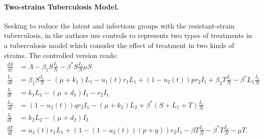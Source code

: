 \paragraph{Two-strains Tuberculosis Model.}
Seeking to reduce the latent and infectious groups with the 
resistant-strain tuberculosis, in \cite{Lenhart2002} the authors  use 
controls ro represents 	two types of treatments in a tuberculosis model 
which consider the effect of treatment in two kinds of strains. The 
controlled version reads:
%
%	
%
%
	\begin{equation}\label{eqn:TB}
	  \begin{aligned}
	    \frac{dS}{dt} &=
		    \Lambda - \beta_1 S \frac{I_1}{N} 
		    - \beta^{*} S \frac{I_2}{N}
		    \mu S
		  \\
		  \frac{L_1}{dt} &=
			  \beta_1 S \frac{I_1}{N}
			  - (\mu + k_1) L_1
			  - u_1 (t) r_1 L_1
			  + (1 - u_2 (t)) p r_2 I_1
				+ \beta_2 T \frac{I_1}{N}
				- \beta^{*} L_1 \frac{I_2}{N}
			\\
			\frac{I_1}{dt} &= 
				k_1 L_1
				- (\mu + d_1) I_1
				-r_2 I_1
			\\
			\frac{L_2}{dt} &=
				(1 - u_2(t)) q r_2 I_1
				- (\mu + k_2) L_2
				+ \beta^{*} (S + L_1 + T) \frac{I_2}{N}
			\\
			\frac{I_2}{dt} &=
				k_2 L_2 - (\mu + d_2) I_2
			\\
			\frac{d T}{dt} &=
				u_1(t) r_1 L_1
				+ (1 - (1 - u_2(t))(p + q)) r_2 I_1
				- \beta T \frac{I_1}{N}
				- \beta^{*} T \frac{I_2}{N}
				-\mu T.
	  \end{aligned}
	\end{equation}

